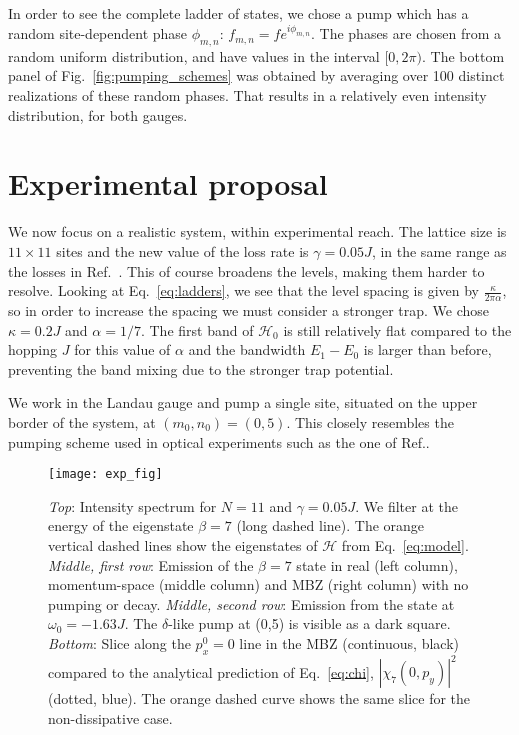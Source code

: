 \documentclass[twocolumn, 10pt, aps, superscriptaddress, floatfix, showpacs, pra, citeautoscript]{revtex4-1}
\newcommand{\co}[2]{#2}
\renewcommand{\paragraph}{\co}
\begin{document}
\paragraph{One must use a random phase in order to see all the states.}
In order to see the complete ladder of states, we chose a pump which
has a random site-dependent phase $\phi_{m,n}$:
$f_{m,n}=fe^{i\phi_{m,n}}$.  The phases are chosen from a random
uniform distribution, and have values in the interval $[0,2\pi)$. The
bottom panel of Fig.~\ref{fig:pumping_schemes} was obtained by
averaging over 100 distinct realizations of these random phases. That
results in a relatively even intensity distribution, for both gauges.

\section{Experimental proposal}
\label{sec:experiment}

\paragraph{Greater dissipation implies spectral broadening.}
We now focus on a realistic system, within experimental reach. The
lattice size is $11 \times 11$ sites and the new value of the loss
rate is $\gamma = 0.05 J$, in the same range as the losses in
Ref.~. This of course broadens the
levels, making them harder to resolve. Looking at
Eq.~\eqref{eq:ladders}, we see that the level spacing is given by
$\frac{\kappa}{2\pi\alpha}$, so in order to increase the spacing we
must consider a stronger trap. We chose $\kappa = 0.2 J$ and
$\alpha = 1/7$. The first band of $\mathcal{H}_0$ is still relatively
flat compared to the hopping $J$ for this value of $\alpha$ and the
bandwidth $E_1 - E_0$ is larger than before, preventing the band
mixing due to the stronger trap potential.

We work in the Landau gauge and pump a single site, situated on the
upper border of the system, at $(m_0,n_0)= (0,5)$. This closely
resembles the pumping scheme used in optical experiments such as the
one of Ref.\cite{hafezi2013imaging}. 

\begin{figure}[htb]
  \centering
  \texttt{[image: exp\_fig]} %
  \caption{\emph{Top}: Intensity spectrum for $N=11$ and
    $\gamma = 0.05 J$. We filter at the energy of the eigenstate
    $\beta=7$ (long dashed line). The orange vertical dashed lines
    show the eigenstates of $\mathcal{H}$ from Eq.~\eqref{eq:model}.
  \emph{Middle, first row}: Emission of the $\beta=7$ state in real
    (left column), momentum-space (middle column) and MBZ (right
    column) with no pumping or decay.
    \emph{Middle, second row}: Emission from the state at $\omega_0 = -1.63 J$.
    The $\delta$-like pump at (0,5) is visible as a dark square.
    \emph{Bottom}: Slice along the $p_x^0 = 0$ line in the MBZ
    (continuous, black) compared to the analytical prediction of
    Eq.~\eqref{eq:chi}, $|\chi_7(0,p_y)|^2$ (dotted, blue). The orange
    dashed curve shows the same slice for the non-dissipative case.}
  \label{fig:exp}
\end{figure}
\end{document}
